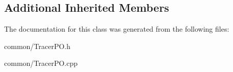 \subsection*{Additional Inherited Members}


The documentation for this class was generated from the following files\+:\begin{DoxyCompactItemize}
\item 
common/Tracer\+P\+O.\+h\item 
common/Tracer\+P\+O.\+cpp\end{DoxyCompactItemize}
